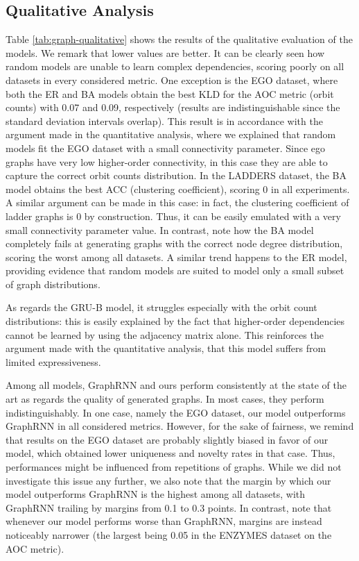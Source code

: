 \subsection{Qualitative Analysis}
Table \ref{tab:graph-qualitative} shows the results of the qualitative evaluation of the models. We remark that lower values are better.
It can be clearly seen how random models are unable to learn complex dependencies, scoring poorly on all datasets in every considered metric. One exception is the EGO dataset, where both the ER and BA models obtain the best KLD for the AOC metric (orbit counts) with 0.07 and 0.09, respectively (results are indistinguishable since the standard deviation intervals overlap). This result is in accordance with the argument made in the quantitative analysis, where we explained that random models fit the EGO dataset with a small connectivity parameter. Since ego graphs have very low higher-order connectivity, in this case they are able to capture the correct orbit counts distribution. In the LADDERS dataset, the BA model obtains the best ACC (clustering coefficient), scoring $0$ in all experiments. A similar argument can be made in this case: in fact, the clustering coefficient of ladder graphs is 0 by construction. Thus, it can be easily emulated with a very small connectivity parameter value. In contrast, note how the BA model completely fails at generating graphs with the correct node degree distribution, scoring the worst among all datasets. A similar trend happens to the ER model, providing evidence that random models are suited to model only a small subset of graph distributions.

As regards the GRU-B model, it struggles especially with the orbit count distributions: this is easily explained by the fact that higher-order dependencies cannot be learned by using the adjacency matrix alone. This reinforces the argument made with the quantitative analysis, \ie that this model suffers from limited expressiveness.

Among all models, GraphRNN and ours perform consistently at the state of the art as regards the quality of generated graphs. In most cases, they perform indistinguishably. In one case, namely the EGO dataset, our model outperforms GraphRNN in all considered metrics. However, for the sake of fairness, we remind that results on the EGO dataset are probably slightly biased in favor of our model, which obtained lower uniqueness and novelty rates in that case. Thus, performances might be influenced from repetitions of  graphs. While we did not investigate this issue any further, we also note that the margin by which our model outperforms GraphRNN is the highest among all datasets, with GraphRNN trailing by margins from 0.1 to 0.3 points. In contrast, note that whenever our model performs worse than GraphRNN, margins are instead noticeably narrower (the largest being 0.05 in the ENZYMES dataset on the AOC metric).

